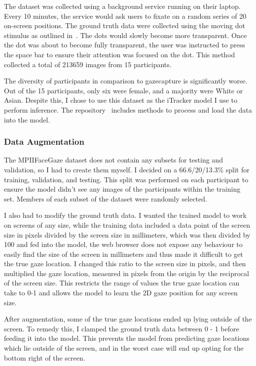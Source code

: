 \documentclass[twocolumn]{report}
\begin{document}
The dataset was collected using a background service running on their laptop. Every 10 minutes, the service would ask users to fixate on a random series of 20 on-screen positions. The ground truth data were collected using the moving dot stimulus as outlined in~\cite{kassner2014pupil}. The dots would slowly become more transparent. Once the dot was about to become fully transparent, the user was instructed to press the space bar to ensure their attention was focused on the dot. This method collected a total of 213659 images from 15 participants. 

The diversity of participants in comparison to gazecapture is significantly worse. Out of the 15 participants, only six were female, and a majority were White or Asian. Despite this, I chose to use this dataset as the iTracker model I use to perform inference. The repository~\cite{krafka2016eye,cheng2021survey} includes methods to process and load the data into the model. 

\subsubsection{Data Augmentation}

The MPIIFaceGaze dataset does not contain any subsets for testing and validation, so I had to create them myself. I decided on a 66.6/20/13.3\% split for training, validation, and testing. This split was performed on each participant to ensure the model didn't see any images of the participants within the training set. Members of each subset of the dataset were randomly selected. 

I also had to modify the ground truth data. I wanted the trained model to work on screens of any size, while the training data included a data point of the screen size in pixels divided by the screen size in millimeters, which was then divided by 100 and fed into the model, the web browser does not expose any behaviour to easily find the size of the screen in millimeters and thus made it difficult to get the true gaze location. I changed this ratio to the screen size in pixels, and then multiplied the gaze location, measured in pixels from the origin by the reciprocal of the screen size. This restricts the range of values the true gaze location can take to 0-1 and allows the model to learn the 2D gaze position for any screen size. 

After augmentation, some of the true gaze locations ended up lying outside of the screen. To remedy this, I clamped the ground truth data between 0 - 1 before feeding it into the model. This prevents the model from predicting gaze locations which lie outside of the screen, and in the worst case will end up opting for the bottom right of the screen. 
\end{document}

